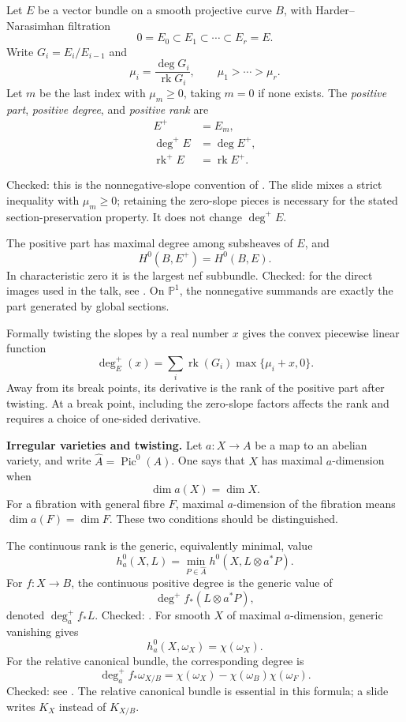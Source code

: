 \begin{definition}
\label{definition-barja-positive-degree}
Let $E$ be a vector bundle on a smooth
projective curve $B$, with
Harder--Narasimhan filtration
$$
0=E_0\subset E_1\subset\cdots
\subset E_r=E.
$$
Write $G_i=E_i/E_{i-1}$ and
$$
\mu_i=\frac{\deg G_i}
{\operatorname{rk}G_i},
\qquad \mu_1>\cdots>\mu_r.
$$
Let $m$ be the last index with
$\mu_m\geq0$, taking $m=0$ if none exists.
The \emph{positive part},
\emph{positive degree}, and
\emph{positive rank} are
$$
\begin{aligned}
E^+&=E_m,\\
\deg^+ E&=\deg E^+,\\
\operatorname{rk}^+E
&=\operatorname{rk}E^+.
\end{aligned}
$$
\end{definition}

Checked: this is the nonnegative-slope
convention of
\cite[Definition 2.2]
{barja-irregular-slopes}.
The slide mixes a strict inequality with
$\mu_m\geq0$; retaining the zero-slope
pieces is necessary for the stated
section-preservation property.
It does not change $\deg^+ E$.

The positive part has maximal degree
among subsheaves of $E$, and
$$
H^0(B,E^+)=H^0(B,E).
$$
In characteristic zero it is the largest
nef subbundle. Checked: for the direct
images used in the talk, see
\cite[Lemma 2.3]{barja-irregular-slopes}.
On $\mathbb{P}^1$, the nonnegative
summands are exactly the part generated
by global sections.

Formally twisting the slopes by a real
number $x$ gives the convex piecewise
linear function
$$
\deg^+_E(x)
=\sum_i\operatorname{rk}(G_i)
\max\{\mu_i+x,0\}.
$$
Away from its break points, its derivative
is the rank of the positive part after
twisting. At a break point, including the
zero-slope factors affects the rank and
requires a choice of one-sided derivative.

\medskip\noindent
{\bf Irregular varieties and twisting.}
Let $a\colon X\to A$ be a map to an
abelian variety, and write
$\widehat A=\operatorname{Pic}^0(A)$.
One says that $X$ has maximal
$a$-dimension when
$$
\dim a(X)=\dim X.
$$
For a fibration with general fibre $F$,
maximal $a$-dimension of the fibration
means $\dim a(F)=\dim F$.
These two conditions should be
distinguished.

The continuous rank is the generic,
equivalently minimal, value
$$
h_a^0(X,L)=
\min_{P\in\widehat A}
h^0(X,L\otimes a^*P).
$$
For $f\colon X\to B$, the continuous
positive degree is the generic value of
$$
\deg^+f_*(L\otimes a^*P),
$$
denoted $\deg_a^+f_*L$.
Checked:
\cite[Definition 2.4]
{barja-irregular-slopes}.
For smooth $X$ of maximal $a$-dimension,
generic vanishing gives
$$
h_a^0(X,\omega_X)=\chi(\omega_X).
$$
For the relative canonical bundle, the
corresponding degree is
$$
\deg_a^+f_*\omega_{X/B}
=\chi(\omega_X)
-\chi(\omega_B)\chi(\omega_F).
$$
Checked: see
\cite[Example 2.5]{barja-irregular-slopes}.
The relative canonical bundle is essential
in this formula; a slide writes $K_X$
instead of $K_{X/B}$.

